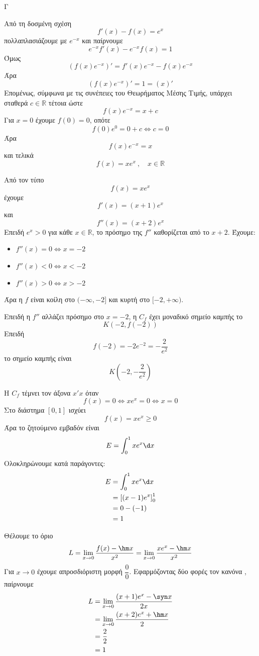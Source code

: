 
\begin{thema}{Γ}
\begin{erwthma}
\item Από τη δοσμένη σχέση
\[
f'(x)-f(x)=e^x
\]
πολλαπλασιάζουμε με $e^{-x}$ και παίρνουμε
\[
e^{-x}f'(x)-e^{-x}f(x)=1
\]
Όμως
\[
\left(f(x)e^{-x}\right)'=f'(x)e^{-x}-f(x)e^{-x}
\]
Άρα
\[
\left(f(x)e^{-x}\right)'=1=(x)'
\]
Επομένως, σύμφωνα με τις συνέπειες του Θεωρήματος Μέσης Τιμής, υπάρχει σταθερά $c\in\mathbb{R}$ τέτοια ώστε
\[
f(x)e^{-x}=x+c
\]
Για $x=0$ έχουμε $f(0)=0$, οπότε
\[
f(0)e^0=0+c\Leftrightarrow c=0
\]
Άρα
\[
f(x)e^{-x}=x
\]
και τελικά
\[
f(x)=xe^x\ ,\quad x\in\mathbb{R}
\]

\item Από τον τύπο
\[
f(x)=xe^x
\]
έχουμε
\[
f'(x)=(x+1)e^x
\]
και
\[
f''(x)=(x+2)e^x
\]
Επειδή $e^x>0$ για κάθε $x\in\mathbb{R}$, το πρόσημο της $f''$ καθορίζεται από το $x+2$.
Έχουμε:
\begin{itemize}
\item $f''(x)=0\Leftrightarrow x=-2$
\item $f''(x)<0\Leftrightarrow x<-2$
\item $f''(x)>0\Leftrightarrow x>-2$
\end{itemize}
Άρα η $f$ είναι κοίλη στο $(-\infty,-2]$ και κυρτή στο $[-2,+\infty)$.

Επειδή η $f''$ αλλάζει πρόσημο στο $x=-2$, η $C_f$ έχει μοναδικό σημείο καμπής το
\[
K(-2,f(-2))
\]
Επειδή
\[
f(-2)=-2e^{-2}=-\frac{2}{e^2}
\]
το σημείο καμπής είναι
\[
K\left(-2,-\frac{2}{e^2}\right)
\]

\item Η $C_f$ τέμνει τον άξονα $x'x$ όταν
\[
f(x)=0\Leftrightarrow xe^x=0\Leftrightarrow x=0
\]
Στο διάστημα $[0,1]$ ισχύει
\[
f(x)=xe^x\geq 0
\]
Άρα το ζητούμενο εμβαδόν είναι
\[
E=\dint_0^1 xe^x\d x
\]
Ολοκληρώνουμε κατά παράγοντες:
\begin{align*}
E
&=\dint_0^1 xe^x\d x\\
&=\left[(x-1)e^x\right]_0^1\\
&=0-(-1)\\
&=1
\end{align*}

\item Θέλουμε το όριο
\[
L=\lim\limits_{x\to 0}\frac{f(x)-\hm x}{x^2}
=\lim\limits_{x\to 0}\frac{xe^x-\hm x}{x^2}
\]
Για $x\to 0$ έχουμε απροσδιόριστη μορφή $\dfrac{0}{0}$.
Εφαρμόζοντας δύο φορές τον κανόνα , παίρνουμε
\begin{align*}
L
&=\lim\limits_{x\to 0}\frac{(x+1)e^x-\syn x}{2x}\\
&=\lim\limits_{x\to 0}\frac{(x+2)e^x+\hm x}{2}\\
&=\frac{2}{2}\\
&=1
\end{align*}
\end{erwthma}
\end{thema}

